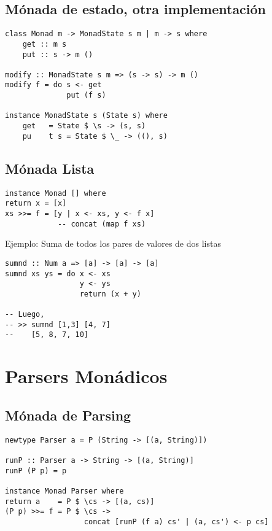 \documentclass{article}
\begin{document}
\subsection{Mónada de estado, otra implementación}

\begin{lstlisting}
class Monad m -> MonadState s m | m -> s where
    get :: m s
    put :: s -> m ()

modify :: MonadState s m => (s -> s) -> m ()
modify f = do s <- get
              put (f s)

instance MonadState s (State s) where
    get   = State $ \s -> (s, s)
    pu    t s = State $ \_ -> ((), s)
\end{lstlisting}

\subsection{Mónada Lista}

\begin{lstlisting}
instance Monad [] where
return x = [x]
xs >>= f = [y | x <- xs, y <- f x]
            -- concat (map f xs)
\end{lstlisting}

Ejemplo: Suma de todos los pares de valores de dos listas

\begin{lstlisting}
sumnd :: Num a => [a] -> [a] -> [a]
sumnd xs ys = do x <- xs
                 y <- ys
                 return (x + y)
                 
-- Luego, 
-- >> sumnd [1,3] [4, 7]
--    [5, 8, 7, 10]     
\end{lstlisting}

\section{Parsers Monádicos}\label{sec:parsers_monadicos}

\subsection{Mónada de Parsing}

\begin{lstlisting}
newtype Parser a = P (String -> [(a, String)])

runP :: Parser a -> String -> [(a, String)]
runP (P p) = p

instance Monad Parser where
return a    = P $ \cs -> [(a, cs)]
(P p) >>= f = P $ \cs ->
                  concat [runP (f a) cs' | (a, cs') <- p cs]
\end{lstlisting}
\end{document}
